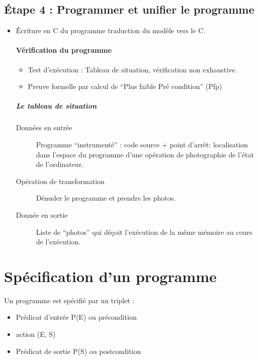 \documentclass[12pt,a4paper,openany]{book}
\begin{document}
		\section{\'Etape 4 : Programmer et unifier le programme}	
		\begin{itemize}
			\item \'Ecriture en C du programme traduction du modèle vers le C.
				\subsubsection{Vérification du programme}
				\begin{itemize}
					\item Test d'exécution : Tableau de situation, vérification non exhaustive.
					\item Preuve formelle par calcul de ``Plus faible Pré condition'' (Pfp)
				\end{itemize}
				\paragraph{Le tableau de situation}
				\begin{description}
					\item[Données en entrée] Programme ``instrumenté'' : code source + point d'arrêt: 
						localisation dans l'espace du programme d'une opération de photographie de l'état de l'ordinateur.
					\item[Opération de transformation] Dénuder le programme et prendre les photos. 
					\item[Donnée en sortie] Liste de ``photos'' qui déçoit l'exécution de la même mémoire au cours de l'exécution.
				\end{description}
		\end{itemize}

	\chapter{Spécification d'un programme}
	Un programme est spécifié par un triplet : 
	\begin{itemize}
		\item Prédicat d'entrée P(E) ou précondition
		\item action (E, S)
		\item Prédicat de sortie P(S) ou postcondition
	\end{itemize}
\end{document}
